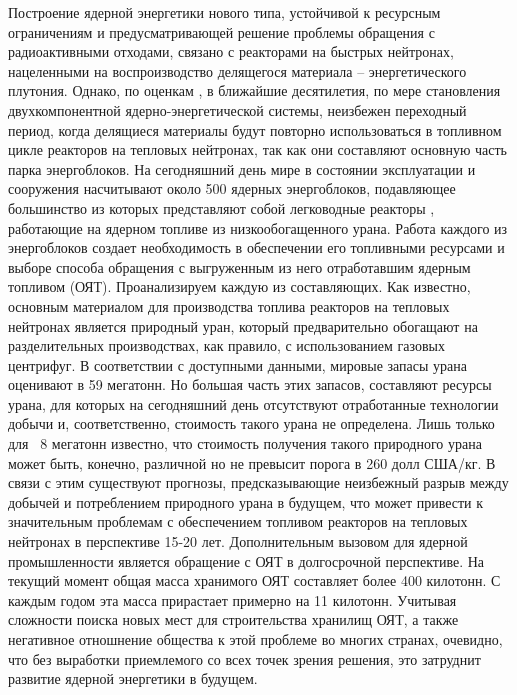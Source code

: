 {\actuality}
Построение ядерной энергетики нового типа, устойчивой к ресурсным ограничениям и предусматривающей решение проблемы обращения с радиоактивными отходами, связано с реакторами на быстрых нейтронах, нацеленными на воспроизводство делящегося материала -- энергетического  плутония. Однако, по оценкам \cite{andrianovaPerspektivnyeToplivnyeZagruzki2015}, в ближайшие десятилетия, по мере становления двухкомпонентной ядерно-энергетической системы, неизбежен переходный период, когда делящиеся материалы будут повторно использоваться в топливном цикле реакторов на тепловых нейтронах, так как они составляют основную часть парка энергоблоков.
На сегодняшний день мире в состоянии эксплуатации и сооружения насчитывают около 500 ядерных энергоблоков, подавляющее большинство из которых представляют собой легководные реакторы \cite{PRISHome}, работающие на ядерном топливе из низкообогащенного урана. Работа каждого из энергоблоков создает необходимость в обеспечении его топливными ресурсами и выборе способа обращения с выгруженным из него отработавшим ядерным топливом (ОЯТ). Проанализируем каждую из составляющих. 
Как известно, основным материалом для производства топлива реакторов на тепловых нейтронах является природный уран, который предварительно обогащают на разделительных производствах, как правило, с использованием газовых центрифуг. В соответствии с доступными данными, мировые запасы урана  оценивают в 59 мегатонн. Но большая часть этих запасов, составляют ресурсы урана, для которых на сегодняшний день отсутствуют отработанные технологии добычи и, соответственно, стоимость такого урана не определена. Лишь только для ~8 мегатонн известно, что стоимость получения такого природного урана может быть, конечно, различной но не превысит порога в 260 долл США/кг. В связи с этим существуют прогнозы, предсказывающие неизбежный разрыв между добычей и потреблением природного урана в будущем, что может привести к значительным проблемам  с обеспечением топливом реакторов на тепловых нейтронах в перспективе 15-20 лет.  
Дополнительным вызовом для ядерной промышленности является обращение с ОЯТ в долгосрочной перспективе. На текущий момент общая масса хранимого ОЯТ составляет более 400 килотонн. С каждым годом эта масса прирастает примерно на 11 килотонн. Учитывая сложности поиска новых мест для строительства хранилищ ОЯТ, а также негативное отношнение общества к этой проблеме во многих странах, очевидно, что без выработки приемлемого со всех точек зрения решения, это затруднит развитие ядерной энергетики в будущем. 

